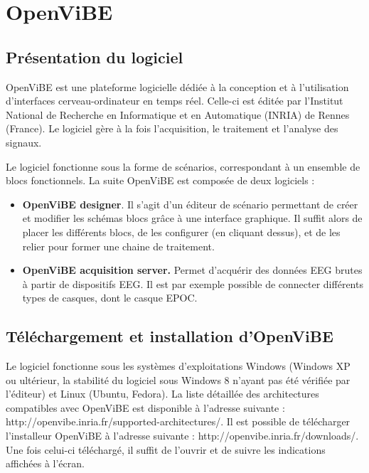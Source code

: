 \newpage
\section*{OpenViBE}

\subsection*{Présentation du logiciel}

OpenViBE est une plateforme logicielle dédiée à la conception et à l'utilisation d'interfaces cerveau-ordinateur en temps réel. Celle-ci est éditée par l'Institut National de Recherche en Informatique et en Automatique (INRIA) de Rennes (France). Le logiciel gère à la fois l'acquisition, le traitement et l'analyse des signaux.

Le logiciel fonctionne sous la forme de scénarios, correspondant à un ensemble de blocs fonctionnels. La suite OpenViBE est composée de deux logiciels : 
\begin{itemize}
	\item \textbf{OpenViBE designer}. Il s'agit d'un éditeur de scénario permettant de  créer et modifier les schémas blocs grâce à une interface graphique. Il suffit alors de placer les différents blocs, de les configurer (en cliquant dessus), et de les relier pour former une chaine de traitement.
	\smallbreak
	\item \textbf{OpenViBE acquisition server.} Permet d'acquérir des données EEG brutes à partir de dispositifs EEG. Il est par exemple possible de connecter différents types de casques, dont le casque EPOC.
	\smallbreak
\end{itemize}

\subsection*{Téléchargement et installation d'OpenViBE}

Le logiciel fonctionne sous les systèmes d'exploitations Windows (Windows XP ou ultérieur, la stabilité du logiciel sous Windows 8 n'ayant pas été vérifiée par l'éditeur) et Linux (Ubuntu, Fedora). La liste détaillée des architectures compatibles avec OpenViBE est disponible à l'adresse suivante : http://openvibe.inria.fr/supported-architectures/.
Il est possible de télécharger l'installeur OpenViBE à l'adresse suivante : http://openvibe.inria.fr/downloads/. Une fois celui-ci téléchargé, il suffit de l'ouvrir et de suivre les indications affichées à l'écran.


